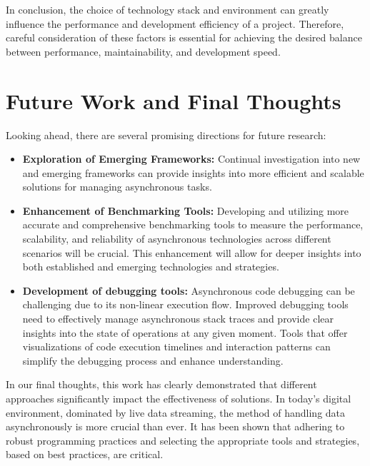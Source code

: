In conclusion, the choice of technology stack and environment can greatly influence the performance and development efficiency of a project. Therefore, careful consideration of these factors is essential for achieving the desired balance between performance, maintainability, and development speed.


\section{Future Work and Final Thoughts}

Looking ahead, there are several promising directions for future research:

\begin{itemize}
    \item \textbf{Exploration of Emerging Frameworks:} Continual investigation into new and emerging frameworks can provide insights into more efficient and scalable solutions for managing asynchronous tasks.
    \item \textbf{Enhancement of Benchmarking Tools:} Developing and utilizing more accurate and comprehensive benchmarking tools to measure the performance, scalability, and reliability of asynchronous technologies across different scenarios will be crucial. This enhancement will allow for deeper insights into both established and emerging technologies and strategies.
    \item \textbf{Development of debugging tools:} Asynchronous code debugging can be challenging due to its non-linear execution flow. Improved debugging tools need to effectively manage asynchronous stack traces and provide clear insights into the state of operations at any given moment. Tools that offer visualizations of code execution timelines and interaction patterns can simplify the debugging process and enhance understanding.
\end{itemize}

In our final thoughts, this work has clearly demonstrated that different approaches significantly impact the effectiveness of solutions. In today's digital environment, dominated by live data streaming, the method of handling data asynchronously is more crucial than ever. It has been shown that adhering to robust programming practices and selecting the appropriate tools and strategies, based on best practices, are critical.
\clearpage


